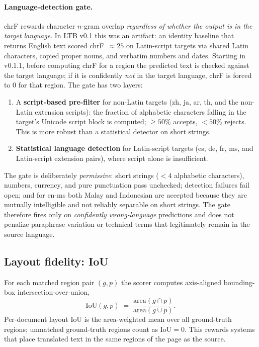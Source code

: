 \documentclass[11pt]{article}
\begin{document}
\paragraph{Language-detection gate.} chrF rewards character $n$-gram overlap
\emph{regardless of whether the output is in the target language}. In LTB v0.1
this was an artifact: an identity baseline that returns English text scored
chrF~$\approx 25$ on Latin-script targets via shared Latin characters, copied
proper nouns, and verbatim numbers and dates. Starting in v0.1.1, before
computing chrF for a region the predicted text is checked against the target
language; if it is confidently \emph{not} in the target language, chrF is forced
to $0$ for that region. The gate has two layers:
\begin{enumerate}
  \item A \textbf{script-based pre-filter} for non-Latin targets (zh, ja, ar,
  th, and the non-Latin extension scripts): the fraction of alphabetic
  characters falling in the target's Unicode script block is computed; $\geq
  50\%$ accepts, $<50\%$ rejects. This is more robust than a statistical
  detector on short strings.
  \item \textbf{Statistical language detection} for Latin-script targets (es,
  de, fr, ms, and Latin-script extension pairs), where script alone is
  insufficient.
\end{enumerate}
The gate is deliberately \emph{permissive}: short strings ($<4$ alphabetic
characters), numbers, currency, and pure punctuation pass unchecked; detection
failures fail open; and for en-ms both Malay and Indonesian are accepted because
they are mutually intelligible and not reliably separable on short strings. The
gate therefore fires only on \emph{confidently wrong-language} predictions and
does not penalize paraphrase variation or technical terms that legitimately
remain in the source language.

\subsection{Layout fidelity: IoU}

For each matched region pair $(g, p)$ the scorer computes axis-aligned
bounding-box intersection-over-union,
\begin{equation}
\mathrm{IoU}(g, p) \;=\; \frac{\mathrm{area}(g \cap p)}{\mathrm{area}(g \cup p)}.
\end{equation}
Per-document layout IoU is the area-weighted mean over all ground-truth regions;
unmatched ground-truth regions count as $\mathrm{IoU}=0$. This rewards systems
that place translated text in the same regions of the page as the source.
\end{document}
